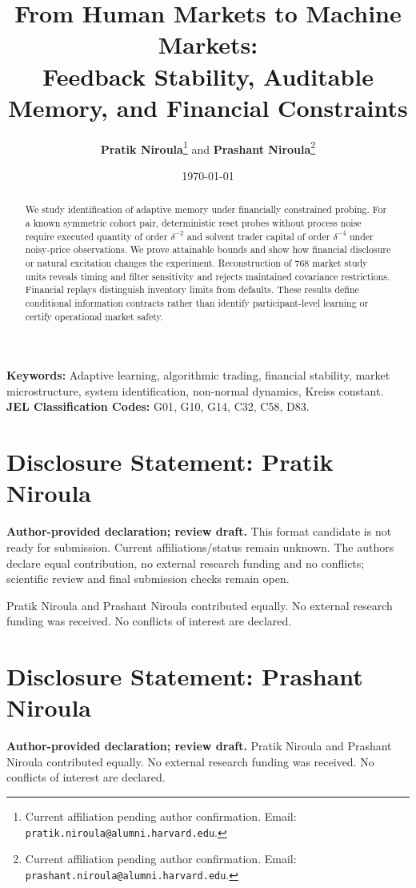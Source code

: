 \documentclass[12pt]{article}
\title{\textbf{From Human Markets to Machine Markets:}\\[0.3em]
\Large Feedback Stability, Auditable Memory, and Financial Constraints}
\author{\textbf{Pratik Niroula}\thanks{Current affiliation pending author confirmation. Email: \texttt{pratik.niroula@alumni.harvard.edu}.} \quad and \quad \textbf{Prashant Niroula}\thanks{Current affiliation pending author confirmation. Email: \texttt{prashant.niroula@alumni.harvard.edu}.}}
\date{\today}
\theoremstyle{definition}
\theoremstyle{remark}
\begin{document}
\maketitle
\thispagestyle{empty}

\vspace{-0.5em}
\begin{abstract}\noindent We study identification of adaptive memory under financially constrained probing. For a known symmetric cohort pair, deterministic reset probes without process noise require executed quantity of order $\delta^{-2}$ and solvent trader capital of order $\delta^{-4}$ under noisy-price observations. We prove attainable bounds and show how financial disclosure or natural excitation changes the experiment. Reconstruction of 768 market study units reveals timing and filter sensitivity and rejects maintained covariance restrictions. Financial replays distinguish inventory limits from defaults. These results define conditional information contracts rather than identify participant-level learning or certify operational market safety.\end{abstract}

\vspace{1.0em}
\noindent\textbf{Keywords:} Adaptive learning, algorithmic trading, financial stability, market microstructure, system identification, non-normal dynamics, Kreiss constant.\\
\textbf{JEL Classification Codes:} G01, G10, G14, C32, C58, D83.

\clearpage
\thispagestyle{empty}
\section*{Disclosure Statement: Pratik Niroula}
\noindent\textbf{Author-provided declaration; review draft.} This format candidate is not ready for submission. Current affiliations/status remain unknown. The authors declare equal contribution, no external research funding and no conflicts; scientific review and final submission checks remain open.

\noindent Pratik Niroula and Prashant Niroula contributed equally. No external research funding was received. No conflicts of interest are declared.

\clearpage
\thispagestyle{empty}
\section*{Disclosure Statement: Prashant Niroula}
\noindent\textbf{Author-provided declaration; review draft.} Pratik Niroula and Prashant Niroula contributed equally. No external research funding was received. No conflicts of interest are declared.
\end{document}
